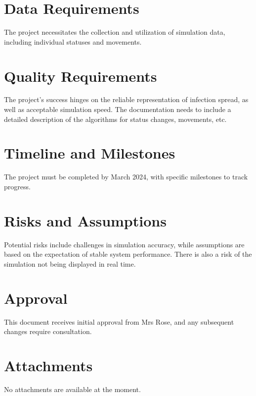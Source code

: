 \documentclass{article}
\begin{document}
	\section{Data Requirements}
	The project necessitates the collection and utilization of simulation data, including individual statuses and movements.
	
	\section{Quality Requirements}
	The project's success hinges on the reliable representation of infection spread, as well as acceptable simulation speed. The documentation needs to include a detailed description of the algorithms for status changes, movements, etc.
	
	\section{Timeline and Milestones}
	The project must be completed by March 2024, with specific milestones to track progress.
	
	\section{Risks and Assumptions}
	Potential risks include challenges in simulation accuracy, while assumptions are based on the expectation of stable system performance. There is also a risk of the simulation not being displayed in real time.
	
	\section{Approval}
	This document receives initial approval from Mrs Rose, and any subsequent changes require consultation.
	
	\section{Attachments}
	No attachments are available at the moment.
	
\end{document}
